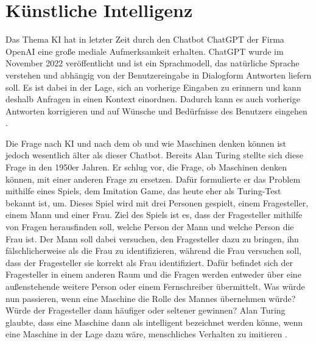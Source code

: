 \section{Künstliche Intelligenz}
\label{chap:KI}

Das Thema \ac{KI} hat in letzter Zeit durch den Chatbot ChatGPT der Firma OpenAI eine große mediale Aufmerksamkeit erhalten. 
ChatGPT wurde im November 2022 veröffentlicht und ist ein Sprachmodell, das natürliche Sprache verstehen und abhängig von der 
Benutzereingabe in Dialogform Antworten liefern soll. Es ist dabei in der Lage, sich an vorherige Eingaben zu erinnern und kann 
deshalb Anfragen in einen Kontext einordnen. Dadurch kann es auch vorherige Antworten korrigieren und auf Wünsche und Bedürfnisse 
des Benutzers eingehen \cite[]{CHATGPT}. 

Die Frage nach \ac{KI} und nach dem ob und wie Maschinen denken können ist jedoch wesentlich älter als dieser Chatbot. 
Bereits Alan Turing stellte sich diese Frage in den 1950er Jahren. Er schlug vor, die Frage, ob Maschinen denken können,
mit einer anderen Frage zu ersetzen. Dafür formulierte er das Problem mithilfe eines Spiels, dem \glqq Imitation Game\grqq{}, 
das heute eher als Turing-Test bekannt ist, um. Dieses Spiel wird mit drei Personen gespielt, einem Fragesteller, einem Mann und 
einer Frau. Ziel des Spiels ist es, dass der Fragesteller mithilfe von Fragen herausfinden soll, welche Person der Mann und welche Person 
die Frau ist. Der Mann soll dabei versuchen, den Fragesteller dazu zu bringen, ihn fälschlicherweise als die Frau zu identifizieren, während die Frau versuchen soll, 
dass der Fragesteller sie korrekt als Frau identifiziert. Dafür befindet sich der Fragesteller in einem anderen Raum und die Fragen werden entweder 
über eine außenstehende weitere Person oder einem Fernschreiber übermittelt. Was würde nun passieren, wenn eine Maschine die Rolle des Mannes übernehmen würde?
Würde der Fragesteller dann häufiger oder seltener gewinnen? Alan Turing glaubte, dass eine Maschine dann als
intelligent bezeichnet werden könne, wenn eine Maschine in der Lage dazu wäre, menschliches Verhalten zu imitieren \cite[vgl. S.433f.]{TURING}.


